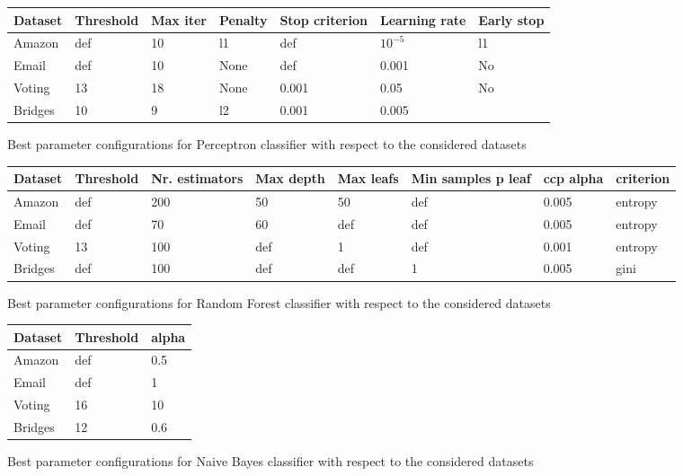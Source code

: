 \documentclass[11pt]{article}
\begin{document}
\begin{figure}[h]
\centering
  \begin{tabular}{ | l | l | l | l | l | l | l |}
	\hline
    Dataset & Threshold & Max iter & Penalty & Stop criterion & Learning rate & Early stop\\  
    \hline
    Amazon  & def & 10 & l1   & def & $10^{-5}$ & l1   \\  
    \hline
    Email   & def & 10 & None & def & 0.001     & No \\  
    \hline
    Voting & 13 & 18 & None & 0.001 & 0.05 & No  \\
    \hline
   Bridges & 10 & 9 & l2 & 0.001 & 0.005 &   \\
	\hline
    \end{tabular}
    \caption{Best parameter configurations for Perceptron classifier with respect to the considered datasets}
    \label{fig_conc1}
  \end{figure}
  
  \begin{figure}[h]
\centering
  \begin{tabular}{ | l | l | l | l | l | l | l | l|}
	\hline
    Dataset & Threshold & Nr. estimators & Max depth & Max leafs & Min samples p leaf & ccp alpha & criterion\\  
    \hline
    Amazon  & def & 200  & 50   & 50    & def   &	0.005 & entropy	 \\  
    \hline
    Email   & def &  70  &  60  &  def  &  def  & 0.005 & entropy	 \\  
    \hline
    Voting  & 13  & 100  & def  & 1     & def   & 0.001 & entropy  \\
    \hline
    Bridges & def &  100 &  def &  def  &  1     & 0.005 & gini\\
	\hline
    \end{tabular}%
    \caption{Best parameter configurations for Random Forest classifier with respect to the considered datasets}
    \label{fig_conc2}
  \end{figure}
  
  
\begin{figure}[h]
\centering
  \begin{tabular}{ | l | l | l |}
	\hline
    Dataset & Threshold & alpha \\  
    \hline
    Amazon  & def & 0.5    \\  
    \hline
    Email   & def & 1 \\  
    \hline
    Voting & 16 &  10 \\
    \hline
    Bridges & 12 & $0.6$ \\
	\hline
    \end{tabular}
    \caption{Best parameter configurations for Naive Bayes classifier with respect to the considered datasets}
    \label{tab_conc1}
  \end{figure}
  
\newpage
%
\newpage
 

\end{document}
